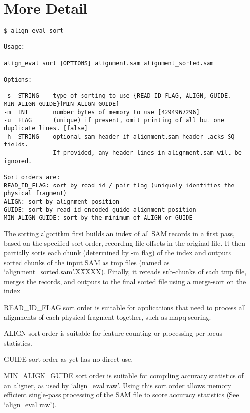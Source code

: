 \documentclass[10pt]{article}
\begin{document}
\section{More Detail}

{\small
\begin{verbatim}
$ align_eval sort

Usage:

align_eval sort [OPTIONS] alignment.sam alignment_sorted.sam

Options:

-s  STRING    type of sorting to use {READ_ID_FLAG, ALIGN, GUIDE, MIN_ALIGN_GUIDE}[MIN_ALIGN_GUIDE]
-m  INT       number bytes of memory to use [4294967296]
-u  FLAG      (unique) if present, omit printing of all but one duplicate lines. [false]
-h  STRING    optional sam header if alignment.sam header lacks SQ fields.
              If provided, any header lines in alignment.sam will be ignored.

Sort orders are:
READ_ID_FLAG: sort by read id / pair flag (uniquely identifies the physical fragment)
ALIGN: sort by alignment position
GUIDE: sort by read-id encoded guide alignment position
MIN_ALIGN_GUIDE: sort by the minimum of ALIGN or GUIDE
\end{verbatim}
}

The sorting algorithm first builds an index of all SAM records in a
first pass, based on the specified sort order, recording file offsets
in the original file. It then partially sorts each chunk (determined
by -m flag) of the index and outputs sorted chunks of the input SAM as
tmp files (named as `alignment\_sorted.sam'.XXXXX). Finally, it rereads
sub-chunks of each tmp file, merges the records, and outputs to the
final sorted file using a merge-sort on the index.

READ\_ID\_FLAG sort order is suitable for applications that need to
process all alignments of each physical fragment together, such as
mapq scoring.

ALIGN sort order is suitable for feature-counting or processing
per-locus statistics.

GUIDE sort order as yet has no direct use.

MIN\_ALIGN\_GUIDE sort order is suitable for compiling accuracy
statistics of an aligner, as used by `align\_eval raw'. Using this sort
order allows memory efficient single-pass processing of the SAM file
to score accuracy statistics (See `align\_eval raw').
\end{document}
